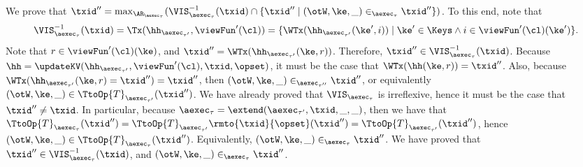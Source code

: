 \begin{itemize}
\begin{itemize}
We prove that 
$\txid'' = \max_{\AR_{\aexec_{\tau}}}(\VIS^{-1}_{\aexec_{\tau}}(\txid) \cap \{ \txid'' \mid (\otW, \ke, \_) \in_{\aexec_{\tau}} \txid''\})$. 
To this end, note that 
\[ 
\VIS^{-1}_{\aexec_{\tau}}(\txid) = \Tx(\hh_{\aexec_{\tau'}}, \viewFun'(\cl)) = \{\WTx(\hh_{\aexec_{\tau'}}(\ke',  i)) \mid \ke' \in \Keys \wedge  i \in \viewFun'(\cl)(\ke')\}.
\]
Note that $r \in \viewFun'(\cl)(\ke)$, and $\txid'' = \WTx(\hh_{\aexec_{\tau'}}(\ke, r))$. 
Therefore, $\txid'' \in \VIS^{-1}_{\aexec_{\tau}}(\txid)$. 
Because $\hh = \updateKV(\hh_{\aexec_{\tau'}}, \viewFun'(\cl), \txid, \opset)$, it 
must be the case that $\WTx(\hh(\ke, r)) = \txid''$. Also, because $\WTx(\hh_{\aexec_{\tau'}}(\ke, r) = \txid'') = \txid''$, 
then $(\otW, \ke, \_) \in_{\aexec_{\tau''}} \txid''$, or equivalently $(\otW, \ke, \_) \in \TtoOp{T}_{\aexec_{\tau'}}(\txid'')$. 
We have already proved that $\VIS_{\aexec_{\tau}}$ is irreflexive, hence it must be the case that $\txid'' \neq \txid$. 
In particular, because $\aexec_{\tau} = \extend(\aexec_{\tau'}, \txid, \_, \_)$, then we have that 
$\TtoOp{T}_{\aexec_{\tau}}(\txid'') = \TtoOp{T}_{\aexec_{\tau'}}\rmto{\txid}{\opset}(\txid'') = 
\TtoOp{T}_{\aexec_{\tau'}}(\txid'')$, hence $(\otW, \ke, \_) \in \TtoOp{T}_{\aexec_{\tau}}(\txid'')$. Equivalently, 
$(\otW, \ke, \_) \in_{\aexec_{\tau}} \txid''$. We have proved that $\txid'' \in \VIS^{-1}_{\aexec_{\tau}}(\txid)$, 
and $(\otW, \ke, \_) \in_{\aexec_{\tau}} \txid''$. 


\end{itemize}
\end{itemize}
